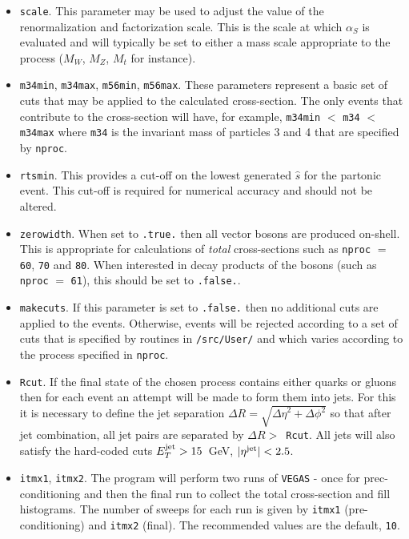 \documentclass[12pt]{article}
\begin{document}
\begin{itemize}
\item {\tt scale}. This parameter may be used to adjust the value
of the renormalization and factorization scale. This is the scale
at which $\alpha_S$ is evaluated and will typically be set to either
a mass scale appropriate to the process ($M_W$, $M_Z$, $M_t$ for
instance).

\item {\tt m34min}, {\tt m34max}, {\tt m56min}, {\tt m56max}.
These parameters represent a basic set of cuts that may be applied
to the calculated cross-section. The only events that contribute to
the cross-section will have, for example,
{\tt m34min} $<$ {\tt m34} $<$ {\tt m34max} where {\tt m34} is the
invariant mass of particles 3 and 4 that are specified by {\tt nproc}.

\item {\tt rtsmin}. This provides a cut-off on the lowest generated
$\hat{s}$ for the partonic event. This cut-off is required for
numerical accuracy and should not be altered.

\item {\tt zerowidth}. When set to {\tt .true.} then all vector
bosons are produced on-shell. This is appropriate for calculations
of {\it total} cross-sections such as {\tt nproc} $=$ {\tt 60},
{\tt 70} and {\tt 80}. When interested in decay products of the
bosons (such as {\tt nproc} $=$ {\tt 61}), this should be set
to {\tt .false.}.

\item {\tt makecuts}. If this parameter is set to {\tt .false.} then
no additional cuts are applied to the events. Otherwise, events will
be rejected according to a set of cuts that is specified by routines
in {\tt /src/User/} and which varies according to the process
specified in {\tt nproc}. 

\item {\tt Rcut}. If the final state of the chosen process contains
either quarks or gluons then for each event an attempt will be made
to form them into jets. For this it is necessary to define the
jet separation $\Delta R=\sqrt{{\Delta \eta}^2 + {\Delta \phi}^2}$
so that after jet combination, all jet pairs are separated by
$\Delta R >$~{\tt Rcut}. All jets will also satisfy the hard-coded
cuts $E_T^{\rm jet} > 15$~GeV, $|\eta^{\rm jet}| < 2.5$.

\item {\tt itmx1}, {\tt itmx2}. The program will perform two runs of
{\tt VEGAS} - once for prec-conditioning and then the final run to
collect the total cross-section and fill histograms. The number of
sweeps for each run is given by {\tt itmx1} (pre-conditioning)
and {\tt itmx2} (final). The recommended values are the default,
{\tt 10}.


\end{itemize}
\end{document}
